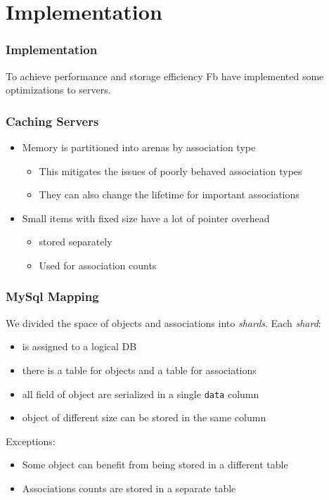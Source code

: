 \section{Implementation}
\begin{frame}
\frametitle{Implementation}
To achieve performance and storage efficiency Fb have implemented some optimizations to servers.  
\end{frame}

\begin{frame}[c]\frametitle{Caching Servers}
\begin{itemize}
	\item Memory is partitioned into arenas by association type
	\begin{itemize}
		\item This mitigates the issues of poorly behaved association types
		\item They can also change the lifetime for important associations
	\end{itemize}
	\item Small items with fixed size have a lot of pointer overhead
	\begin{itemize}
		\item stored separately
		\item Used for association counts
	\end{itemize}
\end{itemize}    
\end{frame}

\begin{frame}[fragile]\frametitle{MySql Mapping}
    We divided the space of objects and associations into \emph{shards}. Each \emph{shard}:
    \begin{itemize}
    	\item is assigned to a logical DB
    	\item there is a table for objects and a table for associations
    	\item all field of object are serialized in a single \verb!data! column
    	\item object of different size can be stored in the same column
    \end{itemize}
Exceptions:
\begin{itemize}
	\item Some object can benefit from being stored in a different table
	\item Associations counts are stored in a separate table
\end{itemize}
\end{frame}

